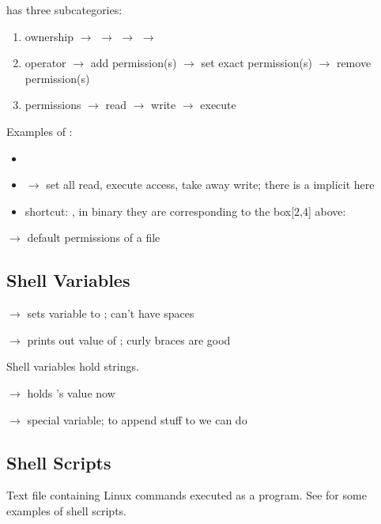  has three subcategories:
\begin{enumerate}[1.]
    \item ownership
    \subitem {} $ \rightarrow $ 
    \subitem {} $ \rightarrow $ 
    \subitem {} $ \rightarrow $ 
    \subitem {} $ \rightarrow $ 
    \item operator
    \subitem \code{+} $ \rightarrow $ add permission(s)
    \subitem \code{=} $ \rightarrow $ set exact permission(s)
    \subitem \code{-} $ \rightarrow $ remove permission(s)
    \item permissions
    \subitem {} $ \rightarrow $ read
    \subitem {} $ \rightarrow $ write
    \subitem {} $ \rightarrow $ execute
\end{enumerate}
Examples of :
\begin{itemize}
    \item {}
    \item {} $ \rightarrow $ set all read, execute access,
    take away write; there is a implicit  here
    \item {}
    \subitem shortcut: , in binary they are corresponding
    to the box[2,4] above: 
\end{itemize}

 $ \rightarrow $ default permissions of a file

\subsection{Shell Variables}
 $ \rightarrow $ sets variable  to ; can't have spaces

 $ \rightarrow $ prints out value of ; curly braces are good

Shell variables hold strings.

 $ \rightarrow $  holds 's value now

 $ \rightarrow $ special variable; to append stuff to
 we can do 

\subsection{Shell Scripts}
Text file containing Linux commands executed as a program. See
 for some examples of shell scripts.

